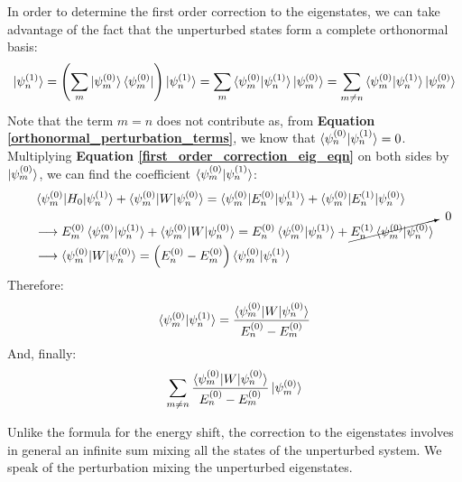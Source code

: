 In order to determine the first order correction to the eigenstates, we can take advantage of the fact that the unperturbed states form a complete orthonormal basis:
\begin{equation}
    \ket{\psi_n^{(1)}} = \left(\sum_m \ket{\psi_m^{(0)}}\bra{\psi_m^{(0)}}\right)\ket{\psi_n^{(1)}} = \sum_m \braket{\psi_m^{(0)}|\psi_n^{(1)}}\ket{\psi_m^{(0)}} = \sum_{m\neq n} \braket{\psi_m^{(0)}|\psi_n^{(1)}}\ket{\psi_m^{(0)}}
\end{equation}
Note that the term $m = n$ does not contribute as, from \textbf{Equation \ref{orthonormal_perturbation_terms}}, we know that $\braket{\psi_n^{(0)}|\psi_n^{(1)}} = 0$. Multiplying \textbf{Equation \ref{first_order_correction_eig_eqn}} on both sides by $\ket{\psi_m^{(0)}}$, we can find the coefficient $\braket{\psi_m^{(0)}|\psi_n^{(1)}}$:
\begin{equation}
    \begin{split}
        &\braket{\psi_m^{(0)}|H_0|\psi_n^{(1)}} + \braket{\psi_m^{(0)}|W|\psi_n^{(0)}} = \braket{\psi_m^{(0)}|E_n^{(0)}|\psi_n^{(1)}} + \braket{\psi_m^{(0)}|E_n^{(1)}|\psi_n^{(0)}}\\
        &\longrightarrow E_m^{(0)}\braket{\psi_m^{(0)}|\psi_n^{(1)}} + \braket{\psi_m^{(0)}|W|\psi_n^{(0)}} = E_n^{(0)}\braket{\psi_m^{(0)}|\psi_n^{(1)}} + \cancelto{\ 0}{E_n^{(1)}\braket{\psi_m^{(0)}|\psi_n^{(0)}}} \\
        &\longrightarrow \braket{\psi_m^{(0)}|W|\psi_n^{(0)}} = \left(E_n^{(0)} - E_m^{(0)}\right)\braket{\psi_m^{(0)}|\psi_n^{(1)}}
    \end{split}
\end{equation}
Therefore:
\begin{equation}
    \braket{\psi_m^{(0)}|\psi_n^{(1)}} = \frac{\braket{\psi_m^{(0)}|W|\psi_n^{(0)}}}{E_n^{(0)} - E_m^{(0)}}
\end{equation}
And, finally:
\begin{equation}
    \sum_{m\neq n} \frac{\braket{\psi_m^{(0)}|W|\psi_n^{(0)}}}{E_n^{(0)} - E_m^{(0)}}\ket{\psi_m^{(0)}}
\end{equation}

Unlike the formula for the energy shift, the correction to the eigenstates involves in general an infinite sum mixing all the states of the unperturbed system. We speak of the perturbation mixing the unperturbed eigenstates.


